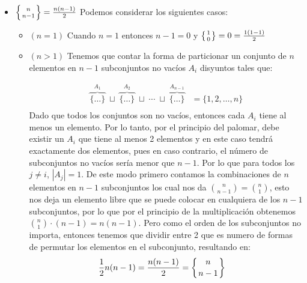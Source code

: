 \begin{solucion}
\begin{itemize}
        \item $\left\{n \atop n-1\right\} = \frac{n(n-1)}{2}$
        Podemos considerar los siguientes casos:
        \begin{itemize}
            \item $(n=1)$ Cuando $n=1$ entonces $n-1=0$ y $\left\{1 \atop 0\right\} = 0 = \frac{1(1-1)}{2}$
            \item $(n>1)$ Tenemos que contar la forma de particionar un conjunto de $n$ elementos en $n-1$ subconjuntos no vacíos $A_i$ disyuntos tales que:

            \begin{align*}
                \overbrace{\{\dots\}}^{A_1} \;\sqcup\; \overbrace{\{\dots\}}^{A_2} \;\sqcup\; \cdots \;\sqcup\; \overbrace{\{\dots\}}        ^{A_{n-1}} &= \{1,2,\dots,n\} \\
            \end{align*}
            Dado que todos los conjuntos son no vacíos, entonces cada $A_i$ tiene al menos un elemento. Por lo tanto, por el principio del palomar, debe existir un $A_i$ que tiene al menos 2 elementos y en este caso tendrá exactamente dos elementos, pues en caso contrario, el número de subconjuntos no vacíos sería menor que $n-1$. Por lo que para todos los $j\neq i$, $|A_j| = 1$. De este modo primero contamos la combinaciones de $n$ elementos en $n-1$ subconjuntos los cual nos da $\binom{n}{n-1} = \binom{n}{1}$, esto nos deja un elemento libre que se puede colocar en cualquiera de los $n-1$ subconjuntos, por lo que por el principio de la multiplicación obtenemos $\binom{n}{1} \cdot (n-1) = n(n-1)$. Pero como el orden de los subconjuntos no importa, entonces tenemos que dividir entre 2 que es numero de formas de permutar los elementos en el subconjunto, resultando en:
            \begin{align*}
                \frac{1}{2} n(n-1) &= \frac{n(n-1)}{2} = \left\{n \atop n-1\right\}
            \end{align*}
        \end{itemize}


\end{itemize}
\end{solucion}
